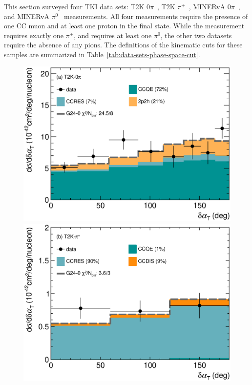 This section surveyed four TKI data sets: T2K $0\pi$~\cite{T2K:2018rnz}, T2K $\pi^+$~\cite{T2K:2021naz}, MINERvA $0\pi$~\cite{MINERvA:2018hba, MINERvA:2019ope}, and MINERvA $\pi^0$~\cite{MINERvA:2020anu} measurements. All four measurements require the presence of one CC muon and at least one proton in the final state. While the \ttkpip measurement requires exactly one $\pi^+$, and \minpiz requires at least one $\pi^0$, the other two datasets require the absence of any pions. The definitions of the kinematic cuts for these samples are summarized in Table~\ref{tab:data-sets-phase-space-cut}. 

\begin{figure} 
    \centering 		
    \includegraphics[width=\dbfigwid\textwidth]{figures/0000-t2k_0pi_dalphat_reac_decomp.eps} 
    \includegraphics[width=\dbfigwid\textwidth]{figures/0000-t2k_pip_dalphat_reac_decomp.eps} 

\end{figure}
